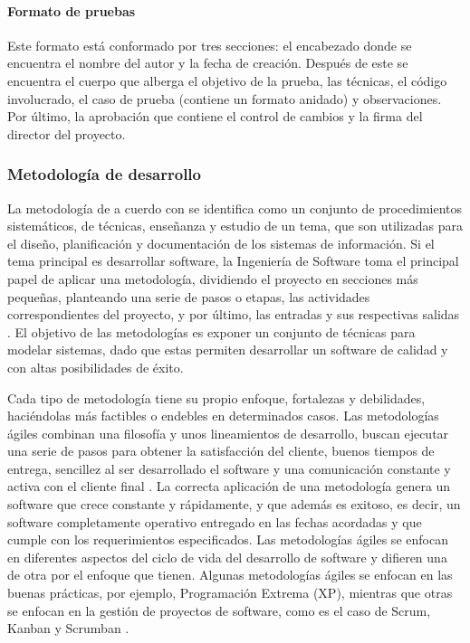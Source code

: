 \paragraph{Formato de pruebas} Este formato está conformado por tres secciones: el encabezado donde se encuentra el nombre del autor y la fecha de creación. Después de este se encuentra el cuerpo que alberga el objetivo de la prueba, las técnicas, el código involucrado, el caso de prueba (contiene un formato anidado) y observaciones. Por último, la aprobación que contiene el control de cambios y la firma del director del proyecto.

\subsubsection{Metodología de desarrollo}
La metodología de a cuerdo con \textcite{CambridgeDefMethodology} se identifica como un conjunto de procedimientos sistemáticos, de técnicas, enseñanza y estudio de un tema, que son utilizadas para el diseño, planificación y documentación de los sistemas de información. Si el tema principal es desarrollar software, la Ingeniería de Software toma el principal papel de aplicar una metodología, dividiendo el proyecto en secciones más pequeñas, planteando una serie de pasos o etapas, las actividades correspondientes del proyecto, y por último, las entradas y sus respectivas salidas \parencite{Sommerville2005}. El objetivo de las metodologías es exponer un conjunto de técnicas para modelar sistemas, dado que estas permiten desarrollar un software de calidad y con altas posibilidades de éxito.

Cada tipo de metodología tiene su propio enfoque, fortalezas y debilidades, haciéndolas más factibles o endebles en determinados casos. Las metodologías ágiles combinan una filosofía y unos lineamientos de desarrollo, buscan ejecutar una serie de pasos para obtener la satisfacción del cliente, buenos tiempos de entrega, sencillez al ser desarrollado el software y una comunicación constante y activa con el cliente final \parencite{Pressman2002}. La correcta aplicación de una metodología genera un software que crece constante y rápidamente, y que además es exitoso, es decir, un software completamente operativo entregado en las fechas acordadas y que cumple con los requerimientos especificados. Las metodologías ágiles se enfocan en diferentes aspectos del ciclo de vida del desarrollo de software y difieren una de otra por el enfoque que tienen. Algunas metodologías ágiles se enfocan en las buenas prácticas, por ejemplo, Programación Extrema (XP), mientras que otras se enfocan en la gestión de proyectos de software, como es el caso de Scrum, Kanban y Scrumban \parencite{Khan2014}.

